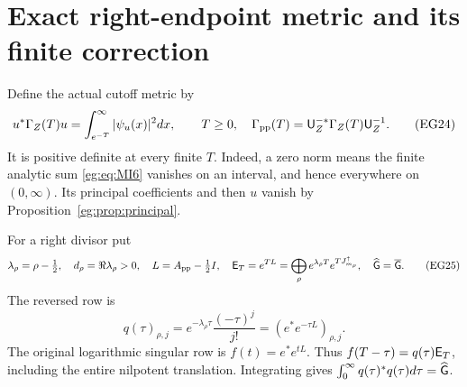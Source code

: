 \section{Exact right-endpoint metric and its finite correction}\label{eg:sec:right-endpoint}
Define the actual cutoff metric by
\[
 u^*\Gamma_Z(T)u=\int_{e^{-T}}^\infty|\psi_u(x)|^2dx,
 \qquad T\ge0,\quad \Gamma_{\rm pp}(T)=\mathsf U_Z^{-*}\Gamma_Z(T)\mathsf U_Z^{-1}.
 \tag{EG24}\label{eg:eq:cutoff}
\]
It is positive definite at every finite $T$. Indeed, a zero norm
means the finite analytic sum \eqref{eg:eq:MI6} vanishes on an interval,
and hence everywhere on $(0,\infty)$. Its principal coefficients
and then $u$ vanish by Proposition~\ref{eg:prop:principal}.

For a right divisor put
\[
 \lambda_\rho=\rho-\tfrac12,\quad d_\rho=\Re\lambda_\rho>0,
 \quad L=A_{\rm pp}-\tfrac12I,\quad
 \mathsf E_T=e^{TL}=\bigoplus_\rho e^{\lambda_\rho T}e^{TJ^\uparrow_{m_\rho}},
 \quad\widehat{\mathsf G}=\overline{\mathsf G}.
 \tag{EG25}\label{eg:eq:E}
\]
The reversed row is
\[
 q(\tau)_{\rho,j}=e^{-\lambda_\rho\tau}\frac{(-\tau)^j}{j!}
                      = (e^*e^{-\tau L})_{\rho,j}.
 \tag{EG26}\label{eg:eq:q}
\]
The original logarithmic singular row is $f(t)=e^*e^{tL}$.
Thus $f(T-\tau)=q(\tau)\mathsf E_T$, including the entire nilpotent
translation. Integrating gives
$\int_0^\infty q(\tau)^*q(\tau)d\tau=\widehat{\mathsf G}$.

